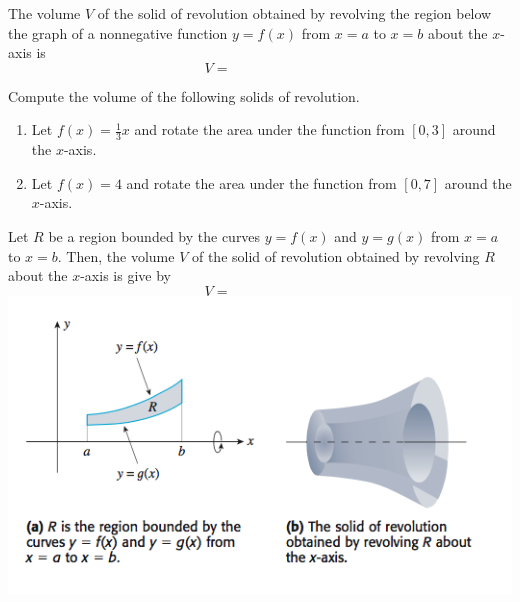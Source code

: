 \documentclass[12pt, a4paper]{article}
\begin{document}
\begin{thrm}
  The volume \(V\) of the solid of revolution obtained by revolving
  the region below the graph of a nonnegative function \(y=f(x)\) from
  \(x=a\) to \(x=b\) about the \(x\)-axis is \[
    V = \hspace{1in}
  \]
\end{thrm}
\vspace{-0.5in}
\begin{ex}
  Compute the volume of the following solids of revolution.
  \begin{enumerate}
  \item Let \(f(x) = \frac{1}{3}x\) and rotate the area under the
    function from \([0,3]\) around the \(x\)-axis.
    \vspace{2in}
  \item Let \(f(x) = 4\) and rotate the area under the function from
    \([0,7]\) around the \(x\)-axis.
  \end{enumerate}
\end{ex}
\begin{thrm}
  Let \(R\) be a region bounded by the curves \(y=f(x)\) and
  \(y=g(x)\) from \(x=a\) to \(x=b\). Then, the volume \(V\) of the
  solid of revolution obtained by revolving \(R\) about the
  \(x\)-axis is give by \[
    V = \hspace{1in}
  \]
  \includegraphics[scale=0.5]{images/surface-of-revolution2}
\end{thrm}
\end{document}
